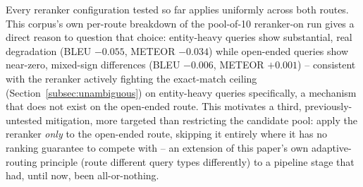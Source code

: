 \documentclass[a4paper,twoside]{article}
\begin{document}
Every reranker configuration tested so far applies uniformly across both routes. This corpus's own per-route breakdown of the pool-of-10 reranker-on run gives a direct reason to question that choice: entity-heavy queries show substantial, real degradation (BLEU $-0.055$, METEOR $-0.034$) while open-ended queries show near-zero, mixed-sign differences (BLEU $-0.006$, METEOR $+0.001$) -- consistent with the reranker actively fighting the exact-match ceiling (Section~\ref{subsec:unambiguous}) on entity-heavy queries specifically, a mechanism that does not exist on the open-ended route. This motivates a third, previously-untested mitigation, more targeted than restricting the candidate pool: apply the reranker \emph{only} to the open-ended route, skipping it entirely where it has no ranking guarantee to compete with -- an extension of this paper's own adaptive-routing principle (route different query types differently) to a pipeline stage that had, until now, been all-or-nothing.
\end{document}
